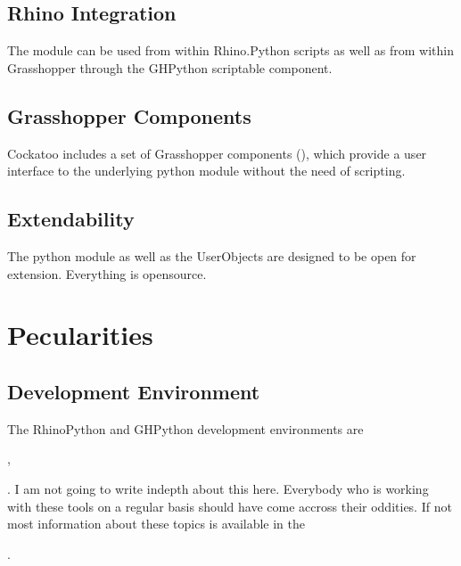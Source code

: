 \documentclass[letterpaper,10pt,english]{sphinxmanual}
\begin{document}
\subsection{Rhino Integration}
\label{\detokenize{README:rhino-integration}}
The  module can be used from within Rhino.Python scripts as
well as from within Grasshopper through the GHPython scriptable
component.


\subsection{Grasshopper Components}
\label{\detokenize{README:grasshopper-components}}
Cockatoo includes a set of Grasshopper components (),
which provide a user interface to the underlying python module without
the need of scripting.


\subsection{Extendability}
\label{\detokenize{README:extendability}}
The python module as well as the UserObjects are designed to be open for
extension. Everything is open\sphinxhyphen{}source.


\section{Pecularities}
\label{\detokenize{README:pecularities}}

\subsection{Development Environment}
\label{\detokenize{README:development-environment}}
The RhinoPython and GHPython development environments are
%
\begin{footnote}[23]\sphinxAtStartFootnote
{}
%
\end{footnote},
%
\begin{footnote}[24]\sphinxAtStartFootnote
{}
%
\end{footnote}
%
\begin{footnote}[25]\sphinxAtStartFootnote
{}
%
\end{footnote}.
I am not going to write in\sphinxhyphen{}depth about this here. Everybody who is
working with these tools on a regular basis should have come accross
their oddities. If not \sphinxhyphen{} most information about these topics is
available in the %
\begin{footnote}[26]\sphinxAtStartFootnote
{}
%
\end{footnote}.
\end{document}
